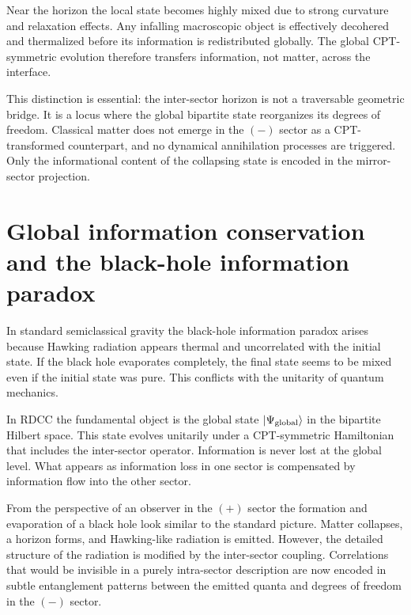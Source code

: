 \documentclass[11pt,a4paper]{article}
\begin{document}
Near the horizon the local state becomes highly mixed due to strong curvature and relaxation
effects. Any infalling macroscopic object is effectively decohered and thermalized before its
information is redistributed globally. The global CPT-symmetric evolution therefore transfers
information, not matter, across the interface.

This distinction is essential: the inter-sector horizon is not a traversable geometric bridge.
It is a locus where the global bipartite state reorganizes its degrees of freedom. Classical matter
does not emerge in the $(-)$ sector as a CPT-transformed counterpart, and no dynamical
annihilation processes are triggered. Only the informational content of the collapsing state is
encoded in the mirror-sector projection.


\section{Global information conservation and the black-hole information paradox}

In standard semiclassical gravity the black-hole information paradox arises because Hawking 
radiation appears thermal and uncorrelated with the initial state. If the black hole evaporates 
completely, the final state seems to be mixed even if the initial state was pure. This conflicts 
with the unitarity of quantum mechanics.

In RDCC the fundamental object is the global state \(\ket{\Psi_{\rm global}}\) in the bipartite 
Hilbert space. This state evolves unitarily under a CPT-symmetric Hamiltonian that includes 
the inter-sector operator. Information is never lost at the global level. What appears as 
information loss in one sector is compensated by information flow into the other sector.

From the perspective of an observer in the \((+)\) sector the formation and evaporation of a 
black hole look similar to the standard picture. Matter collapses, a horizon forms, and 
Hawking-like radiation is emitted. However, the detailed structure of the radiation is modified 
by the inter-sector coupling. Correlations that would be invisible in a purely intra-sector 
description are now encoded in subtle entanglement patterns between the emitted quanta and 
degrees of freedom in the \((-)\) sector.
\end{document}
